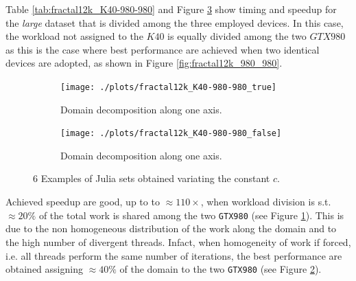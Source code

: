 Table \ref{tab:fractal12k_K40-980-980} and Figure \ref{fig:fractal12k_K40-980-980} show timing and speedup for the \textit{large} dataset that is divided among the three employed devices. In this case, the workload not assigned to the $K40$ is equally divided among the two $GTX980$ as this is the case where best performance are achieved when two identical devices are adopted, as shown in  Figure \ref{fig:fractal12k_980_980}.
\begin{figure}
	\begin{subfigure}{1.0\textwidth}
		\caption{Domain decomposition along one axis.}
		\texttt{[image: ./plots/fractal12k\_K40-980-980\_true]}
				\label{fig:fractal12k_K40-980-980_true}
	\end{subfigure}		
	\endminipage \hfill
	\vspace{5mm}
	\begin{subfigure}{1.0\textwidth}
				\texttt{[image: ./plots/fractal12k\_K40-980-980\_false]}
		\caption{Domain decomposition along one axis.}
		\label{fig:fractal12k_K40-980-980_false}
	\end{subfigure}
	\endminipage\hfill
\caption{6 Examples of Julia sets obtained variating the constant $c$.}
	\label{fig:fractal12k_K40-980-980}

\end{figure}
Achieved speedup are good, up to to $\approx 110 \times$, when workload division is s.t. $\approx 20\%$ of the total work is shared among the two \texttt{GTX980} (see Figure \ref{fig:fractal12k_K40-980-980_true}). 
This is due to the non homogeneous distribution of the work along the domain and to the high number of divergent threads. Infact, when homogeneity of work if forced, i.e. all threads perform the same number of iterations, the best performance are obtained assigning $\approx 40\%$  of the domain  to the two \texttt{GTX980} (see Figure \ref{fig:fractal12k_K40-980-980_false}).

